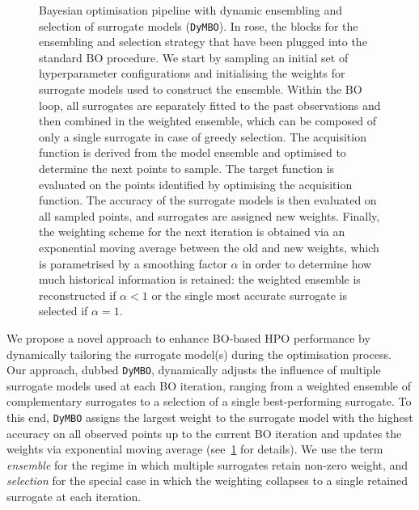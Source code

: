 \begin{figure}[!htbp]
    \caption{
    Bayesian optimisation pipeline with dynamic ensembling and selection of surrogate models (\texttt{DyMBO}). In rose, the blocks for the ensembling and selection strategy that have been plugged into the standard BO procedure.
    We start by sampling an initial set of hyperparameter configurations and initialising the weights for surrogate models used to construct the ensemble. Within the BO loop, all surrogates are separately fitted to the past observations and then combined in the weighted ensemble, 
    which can be composed of only a single surrogate in case of greedy selection. The acquisition function is derived from the model ensemble and optimised to determine the next points to sample. The target function is evaluated on the points identified by optimising the acquisition function. The accuracy of the surrogate models is then evaluated on all sampled points, and surrogates are assigned new weights. Finally, the weighting scheme for the next iteration is obtained via an exponential moving average between the old and new weights, which is parametrised by a smoothing factor $\alpha$ in order to determine how much historical information is retained: 
    the weighted ensemble is reconstructed if $\alpha < 1$ or the single most accurate surrogate is selected if $\alpha = 1$.
    }
    
    \label{fig:ch05:diagram}
\end{figure}

We propose a novel approach to enhance BO-based HPO performance by dynamically tailoring the surrogate model(s) during the optimisation process.
Our approach, dubbed \texttt{DyMBO}, dynamically adjusts the influence of multiple surrogate models used at each BO iteration, ranging from a weighted ensemble of complementary surrogates to a selection of a single best-performing surrogate.
To this end, \texttt{DyMBO}
assigns the largest weight to the surrogate model with the highest accuracy
on all observed points up to the current BO iteration and updates the 
weights via exponential moving average (see~\cref{fig:ch05:diagram} for details).
We use the term
\emph{ensemble} for the regime in which multiple surrogates retain non-zero weight, and \emph{selection} for the special case in which the weighting collapses to a single retained surrogate at each iteration.

